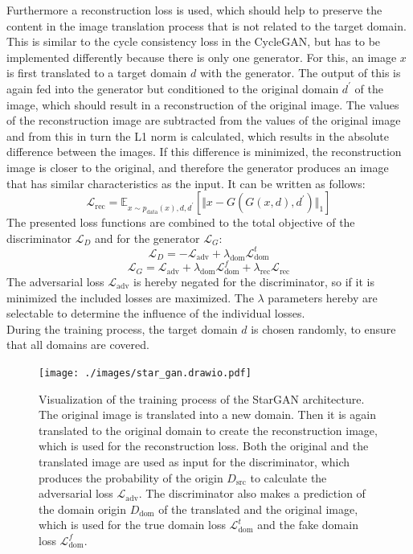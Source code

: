 Furthermore a reconstruction loss is used, which should help to preserve the content in the image translation process that is not related to the target domain.
This is similar to the cycle consistency loss in the CycleGAN, but has to be implemented differently because there is only one generator. 
For this, an image $x$ is first translated to a target domain $d$ with the generator.
The output of this is again fed into the generator but conditioned to the original domain $d^\prime$ of the image, which should result in a reconstruction of the original image.
The values of the reconstruction image are subtracted from the values of the original image and from this in turn the L1 norm is calculated, which results in the absolute difference between the images.
If this difference is minimized, the reconstruction image is closer to the original, and therefore the generator produces an image that has similar characteristics as the input.
It can be written as follows:
\begin{equation}
    \mathcal{L}_{\text{rec}} = \mathbb{E}_{x\sim p_{\text{data}}(x),d,d^\prime}[\Vert x - G(G(x,d),d^\prime)\Vert_1]
    \label{loss_reconstruction}
\end{equation}
The presented loss functions are combined to the total objective of the discriminator $\mathcal{L}_D$ and for the generator $\mathcal{L}_G$:
\begin{equation}
    \mathcal{L}_D = -\mathcal{L}_{\text{adv}} + \lambda_{\text{dom}}\mathcal{L}_{\text{dom}}^t 
\end{equation}
\begin{equation}
    \mathcal{L}_G = \mathcal{L}_{\text{adv}} + \lambda_{\text{dom}}\mathcal{L}_{\text{dom}}^f + \lambda_{\text{rec}}\mathcal{L}_{\text{rec}}
\end{equation}
The adversarial loss $\mathcal{L}_{\text{adv}}$ is hereby negated for the discriminator, so if it is minimized the included losses are maximized.
The $\lambda$ parameters hereby are selectable to determine the influence of the individual losses.\\
During the training process, the target domain $d$ is chosen randomly, to ensure that all domains are covered.
\begin{figure}[bt]
    \begin{center}
     \texttt{[image: ./images/star\_gan.drawio.pdf]}
    \caption[Training process StarGAN]{{Visualization of the training process of the StarGAN architecture.
    The original image is translated into a new domain. Then it is again translated to the original domain to create the reconstruction image, which is used for the reconstruction loss.
    Both the original and the translated image are used as input for the discriminator, which produces the probability of the origin $D_{\text{src}}$ to calculate the adversarial loss $\mathcal{L}_{\text{adv}}$.
    The discriminator also makes a prediction of the domain origin $D_{\text{dom}}$ of the translated and the original image, which is used for the true domain loss $\mathcal{L}_{\text{dom}}^t$ and the fake domain loss $\mathcal{L}_{\text{dom}}^f$.
    }\label{star_gan_training}}
    \end{center}
\end{figure}
